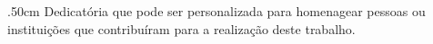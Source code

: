 \thispagestyle{empty}
\vspace*{\fill}
\begin{changemargin}{.5\textwidth}{0cm}
\singlespacing%
\noindent
    Dedicatória que pode ser personalizada para homenagear pessoas ou instituições que contribuíram para a realização deste trabalho.
\end{changemargin}